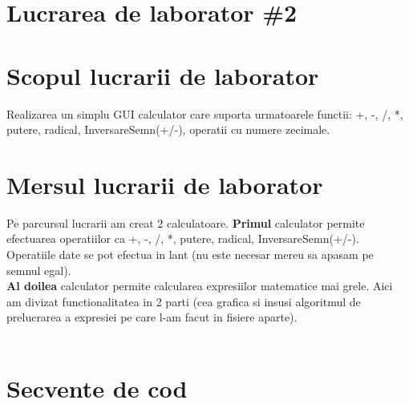 \section*{Lucrarea de laborator \#2}

\section{Scopul lucrarii de laborator}
Realizarea un simplu GUI calculator care suporta urmatoarele functii: +, -, /, *, putere, radical, InversareSemn(+/-), operatii cu numere zecimale.

\section{Mersul lucrarii de laborator}
\tab Pe parcursul lucrarii am creat 2 calculatoare. \textbf{Primul} calculator permite
efectuarea operatiilor ca +, -, /, *, putere, radical, InversareSemn(+/-). Operatiile date se pot efectua in lant (nu este necesar mereu sa apasam pe semnul egal).\\
\tab \textbf{Al doilea} calculator permite calcularea expresiilor matematice mai grele. Aici am divizat functionalitatea in 2 parti (cea grafica si insusi algoritmul de
prelucrarea a expresiei pe care l-am facut in fisiere aparte).\\
\\
\section*{Secvente de cod}

